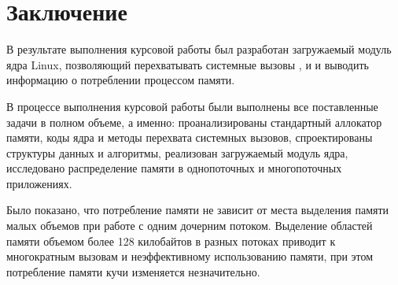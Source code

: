 \chapter*{Заключение}

В результате выполнения курсовой работы был разработан загружаемый модуль ядра Linux, позволяющий перехватывать системные вызовы ,  и  и выводить информацию о потреблении процессом памяти.

В процессе выполнения курсовой работы были выполнены все поставленные задачи в полном объеме, а именно: проанализированы стандартный аллокатор памяти, коды ядра и методы перехвата системных вызовов, спроектированы структуры данных и алгоритмы, реализован загружаемый модуль ядра, исследовано распределение памяти в однопоточных и многопоточных приложениях.

Было показано, что потребление памяти не зависит от места выделения памяти малых объемов при работе с одним дочерним потоком. Выделение областей памяти объемом более 128 килобайтов в разных потоках приводит к многократным вызовам  и неэффективному использованию памяти, при этом потребление памяти кучи изменяется незначительно.